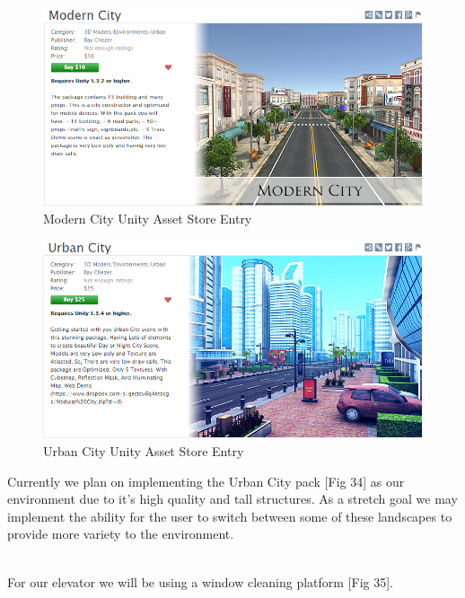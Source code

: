 \documentclass[a4paper,10pt]{article}
\begin{document}
\begin{figure}[H] %
	\centerline {\includegraphics[scale = 0.50]{modernCity.png}}
	\caption{Modern City Unity Asset Store Entry}
	\label{fig:modernCity}
\end{figure}
\begin{figure}[H] %
	\centerline {\includegraphics[scale = 0.50]{urbanCity.png}}
	\caption{Urban City Unity Asset Store Entry}
	\label{fig:urbanCity}
\end{figure}
Currently we plan on implementing the Urban City pack [Fig 34] as our environment due to it's high quality and tall structures. As a stretch goal we may implement the ability for the user to switch between some of these landscapes to provide more variety to the environment.
\par~\\
For our elevator we will be using a window cleaning platform [Fig 35].
\end{document}
